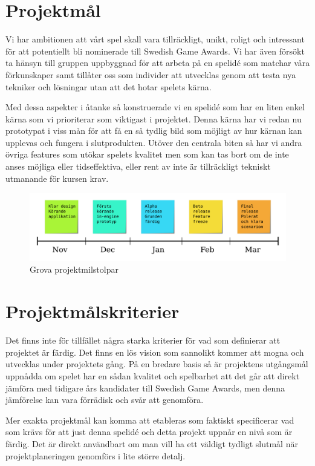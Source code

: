 \documentclass[a4paper]{report}
\begin{document}
\section*{ Projektmål }

Vi har ambitionen att vårt spel skall vara tillräckligt, unikt, roligt och
intressant för att potentiellt bli nominerade till Swedish Game Awards. Vi har
även försökt ta hänsyn till gruppen uppbyggnad för att arbeta på en spelidé som
matchar våra förkunskaper samt tillåter oss som individer att utvecklas genom
att testa nya tekniker och lösningar utan att det hotar spelets kärna.

Med dessa aspekter i åtanke så konstruerade vi en spelidé som har en liten
enkel kärna som vi prioriterar som viktigast i projektet. Denna kärna har vi
redan nu prototypat i viss mån för att få en så tydlig bild som möjligt av hur
kärnan kan upplevas och fungera i slutprodukten.
Utöver den centrala biten så har vi andra övriga features som utökar spelets
kvalitet men som kan tas bort om de inte anses möjliga eller tidseffektiva,
eller rent av inte är tillräckligt tekniskt utmanande för kursen krav.


\begin{figure}[h!]
  \caption{ Grova projektmilstolpar }
  \centering
    \includegraphics[width=1.0\textwidth]{Milstolpar_large.png}
\end{figure}


\section*{ Projektmålskriterier }

Det finns inte för tillfället några starka kriterier för vad som definierar att
projektet är färdig. Det finns en lös vision som sannolikt kommer att mogna och
utvecklas under projektets gång. På en bredare basis så är projektens utgångsmål
uppnådda om spelet har en sådan kvalitet och spelbarhet att det går att direkt
jämföra med tidigare års kandidater till Swedish Game Awards, men denna
jämförelse kan vara förrädisk och svår att genomföra.

Mer exakta projektmål kan komma att etableras som faktiskt specificerar vad som
krävs för att just denna spelidé och detta projekt uppnår en nivå som är
färdig. Det är direkt användbart om man vill ha ett väldigt tydligt slutmål när
projektplaneringen genomförs i lite större detalj.
\end{document}
